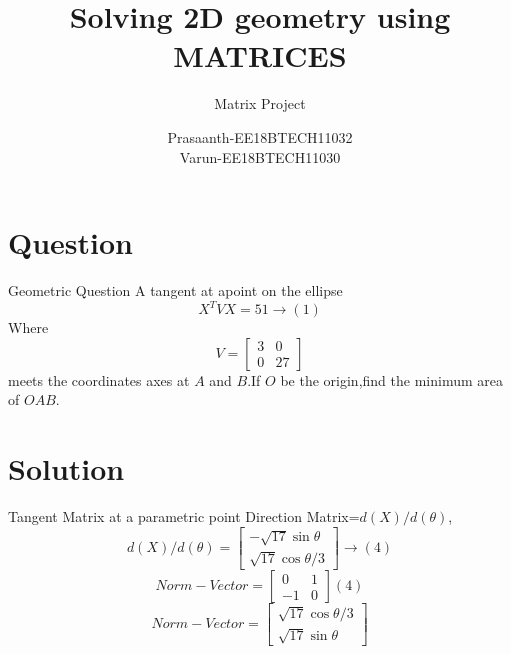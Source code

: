 \documentclass{beamer}
\title[Prasaanth&Varun]{Solving 2D geometry using MATRICES}
\subtitle{Matrix Project}
\author{Prasaanth-EE18BTECH11032\\Varun-EE18BTECH11030}
\begin{document}
\begin{frame}
\titlepage    
\end{frame}

\section{Question}
\begin{frame}{Geometric Question}
A tangent at apoint on the ellipse
$$X^TVX=51\longrightarrow (1)$$
Where
$$V
=
\begin{bmatrix}
3 & 0\\
0 & 27
\end{bmatrix}
$$
meets the coordinates axes at $A$ and $B$.If $O$ be the origin,find the minimum area of \Delta$OAB$.
\end{frame}

\section{Solution}

\begin{frame}{Tangent Matrix at a parametric point }
Direction Matrix=$d(X)/d(\theta)$,\\
$$d(X)/d(\theta)=
\begin{bmatrix}
-\sqrt{17}\sin\theta\\
\sqrt{17}\cos\theta/3
\end{bmatrix}
\longrightarrow (4)$$
$$Norm-Vector=
\begin{bmatrix}
0 & 1\\
-1 & 0
\end{bmatrix}
(4)
$$
\Rightarrow $$Norm-Vector=
\begin{bmatrix}
\sqrt{17}\cos\theta/3 \\
\sqrt{17}\sin\theta
\end{bmatrix}
$$\\

\end{frame}
\end{document}
